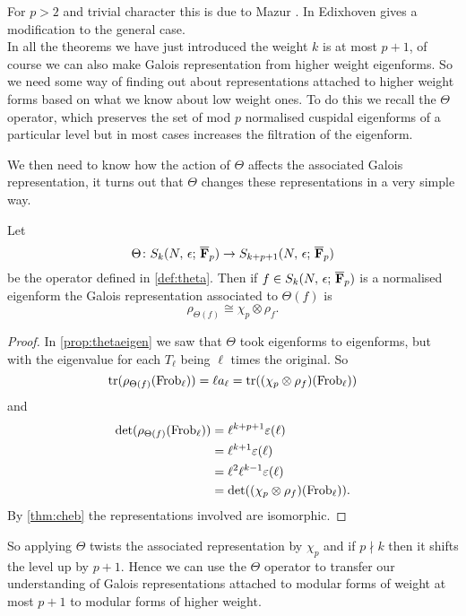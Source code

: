 \documentclass[a4paper,12pt]{article}
\begin{document}
For $p> 2$ and trivial character this is due to Mazur \cite[sec. 6]{Ribet90}.
In \cite[sec. 2]{EdixhovenWeight} Edixhoven gives a modification to the general case.
\\[12pt] \noindent
In all the theorems we have just introduced the weight $k$ is at most $p+1$, of course we can also make Galois representation from higher weight eigenforms.
So we need some way of finding out about representations attached to higher weight forms based on what we know about low weight ones.
To do this we recall the $\Theta$ operator, which preserves the set of mod $p$ normalised cuspidal eigenforms of a particular level but in most cases  increases the filtration of the eigenform.

We then need to know how the action of $\Theta$ affects the associated Galois representation, it turns out that $\Theta$ changes these representations in a very simple way.

\begin{prop}\label{prop:theta}
Let
\[
\Theta\colon S_k(N,\,\epsilon;\,\overline{\mathbf{F}}_p)\to S_{k+p+1}(N,\,\epsilon;\,\overline{\mathbf{F}}_p)
\]
be the operator defined in \cref{def:theta}.
Then if $f \in S_k(N,\,\epsilon;\,\overline{\mathbf{F}}_p)$ is a normalised eigenform the Galois representation associated to $\Theta(f)$ is
\[
\rho_{\Theta(f)} \cong \chi_p\otimes\rho_{f}.
\]
\end{prop}
\begin{proof}
In \cref{prop:thetaeigen} we saw that $\Theta$ took eigenforms to eigenforms, but with the eigenvalue for each $T_{\ell}$ being $\ell$ times the original.
So
\[
\operatorname{tr}(\rho_{\Theta(f)}(\operatorname{Frob}_\ell)) = \ell a_{\ell} = \operatorname{tr}((\chi_p \otimes \rho_{f})(\operatorname{Frob}_{\ell}))
\]
and
\begin{align*}
\det(\rho_{\Theta(f)}(\operatorname{Frob}_\ell)) &= \ell^{k+p+1}\varepsilon(\ell)\\
                                   &= \ell^{k+1}\varepsilon(\ell)\\
                                   &= \ell^2\ell^{k-1}\varepsilon(\ell)\\
                                   &= \det((\chi_p \otimes \rho_{f})(\operatorname{Frob}_{\ell})).
\end{align*}
By \cref{thm:cheb} the representations involved are isomorphic.
\end{proof}

So applying $\Theta$ twists the associated representation by $\chi_p$ and if $p\nmid k$ then it shifts the level up by $p+1$.
Hence we can use the $\Theta$ operator to transfer our understanding of Galois representations attached to modular forms of weight at most $p+1$ to modular forms of higher weight.
\end{document}
